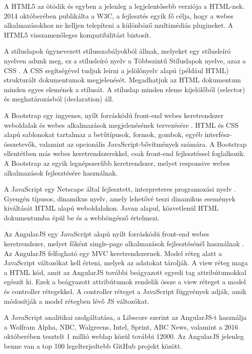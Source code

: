 A HTML5 az ötödik és egyben a jelenleg a legjelentősebb verziója a HTML-nek. 2014 októberében publikálta a W3C, a fejlesztés egyik fő célja, hogy a webes alkalmazásokhoz ne kelljen telepíteni a különböző multimédiás plugineket. A HTML5 visszamenőleges kompatibilitást biztosít.


A stíluslapok úgynevezett stílusszabályokból állnak, melyeket egy stílusleíró nyelven adunk meg, ez a stílusleíró nyelv a Többszintű Stíluslapok nyelve, azaz a CSS \cite{css}. A CSS segítségével tudjuk leírni a jelölőnyelv alapú (például HTML) strukturált dokumentumok megjelenését. Megadhatjuk az HTML dokumentum minden egyes elemének a stílusát. A stíluslap minden eleme kijelölőből (selector) és meghatározásból (declaration) áll.


A Bootstrap egy ingyenes, nyílt forráskódú front-end webes keretrendszer weboldalak és webes alkalmazások megjelenésének tervezésére \cite{bootstrap}. HTML és CSS alapú sablonokat tartalmaz a betűtípusok, formok, gombok, egyéb interfész-összetevők, valamint az opcionális JavaScript-bővítmények számára. A Bootstrap ellentétben más webes keretrendszerekkel, csak front-end fejlesztéssel foglalkozik. A Bootstrap az egyik legnépszerűbb keretrendszer, melyet responsive webes alkalmazások fejlesztésére használnak.


A JavaScript egy Netscape által fejlesztett, interpreteres programozási nyelv \cite{javascript}. Gyengén típusos, dinamikus nyelv, amely lehetővé teszi dinamikus események kiváltását HTML alapú weboldalakon. Javan alapul, közvetlenül HTML dokumentumba épül be és a webböngésző értelmezi.


Az AngularJS egy JavaScript alapú nyílt forráskódú front-end webes keretrendszer, melyet főként single-page alkalmazások fejlesztésénél használnak \cite{angularjs}. Az AngularJS felfogható egy MVC keretrendszernek. Model réteg alatt a JavaScript változókat kell érteni, melyek az adatokat tárolják. A view réteg maga a HTML kód, amit az AngularJS további beágyazott egyedi tag attribútumokkal egészít ki. Ezek a beágyazott attribútumok rendelik össze a view réteget a model és controller rétegekkel. A controller réteget a JavaScript függvények adják, amik módosítják a model rétegben lévő JS változókat.

A JavaScript analitikai szolgáltatása, a Libscore szerint az AngularJS-t használja a Wolfram Alpha, NBC, Walgreens, Intel, Sprint, ABC News, valamint a 2016 októberében tesztelt 1 millió weblap közül további 12000. Az AngularJS jelenleg benne van a top 100 legelterjedtebb GitHub projekt között.

